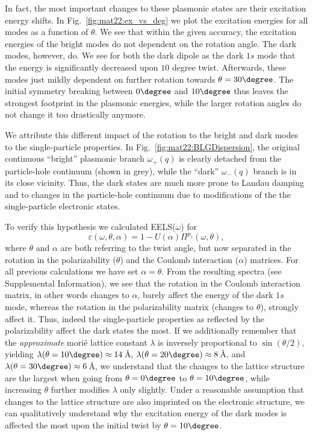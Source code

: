 
In fact, the most important changes to these plasmonic states are their excitation energy shifts. In Fig.~\ref{fig:mat22:ex_vs_deg} we plot the excitation energies for all modes as a function of $\theta$. We see that within the given accuracy, the excitation energies of the bright modes do not dependent on the rotation angle. The dark modes, however, do. We see for both the dark dipole as the dark $1s$ mode that the energy is significantly decreased upon $10$ degree twist. Afterwards, these modes just mildly dependent on further rotation towards $\theta=30\degree$. The initial symmetry breaking between $0\degree$ and $10\degree$ thus leaves the strongest footprint in the plasmonic energies, while the larger rotation angles do not change it too drastically anymore. 

We attribute this different impact of the rotation to the bright and dark modes to the single-particle properties. In Fig.~\ref{fig:mat22:BLGDispersion}, the original continuous ``bright'' plasmonic branch $\omega_+(q)$ is clearly detached from the particle-hole continuum (shown in grey), while the ``dark'' $\omega_-(q)$ branch is in its close vicinity. Thus, the dark states are much more prone to Landau damping and to changes in the particle-hole continuum due to modifications of the the single-particle electronic states. 

To verify this hypothesis we calculated EELS($\omega$) for
\begin{equation*}
    \varepsilon(\omega, \theta, \alpha) = 1 - U(\alpha) \Pi^{p_z}(\omega, \theta),
\end{equation*}
where $\theta$ and $\alpha$ are both referring to the twist angle, but now separated in the rotation in the polarizability ($\theta$) and the Coulomb interaction ($\alpha$) matrices. For all previous calculations we have set $\alpha = \theta$.
From the resulting spectra (see Supplemental Information), %
we see that the rotation in the Coulomb interaction matrix, in other words changes to $\alpha$, barely affect the energy of the dark $1s$ mode, whereas the rotation in the polarizability matrix (changes to $\theta$), strongly affect it.
Thus, indeed the single-particle properties as reflected by the polarizability affect the dark states the most. If we additionally remember that the \emph{approximate} mori\'{e} lattice constant $\lambda$ is inversely proportional to $\sin(\theta/2)$, yielding $\lambda(\theta=10\degree) \approx 14\,$\AA, $\lambda(\theta=20\degree) \approx 8\,$\AA, and $\lambda(\theta=30\degree) \approx 6\,$\AA, we understand that the changes to the lattice structure are the largest when going from $\theta=0\degree$ to $\theta=10\degree$, while increasing $\theta$ further modifies $\lambda$ only slightly. Under a reasonable assumption that changes to the lattice structure are also imprinted on the electronic structure, we can qualitatively understand why the excitation energy of the dark modes is affected the most upon the initial twist by $\theta=10\degree$.

